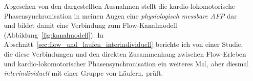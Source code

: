 Abgesehen von den dargestellten Ausnahmen stellt die kardio-lokomotorische Phasensynchronisation in meinen Augen eine \emph{physiologisch messbare \ac{AFP}} dar und bildet damit eine Verbindung zum Flow-Kanalmodell (Abbildung~\ref{fig:kanalmodell}). In Abschnitt~\ref{sec:flow_und_laufen_interindividuell} berichte ich von einer Studie, die diese Verbindungen und den direkten Zusammenhang zwischen Flow-Erleben und kardio-lokomotorischer Phasensynchronisation ein weiteres Mal, aber diesmal \emph{interindividuell} mit einer Gruppe von Läufern, prüft. 

